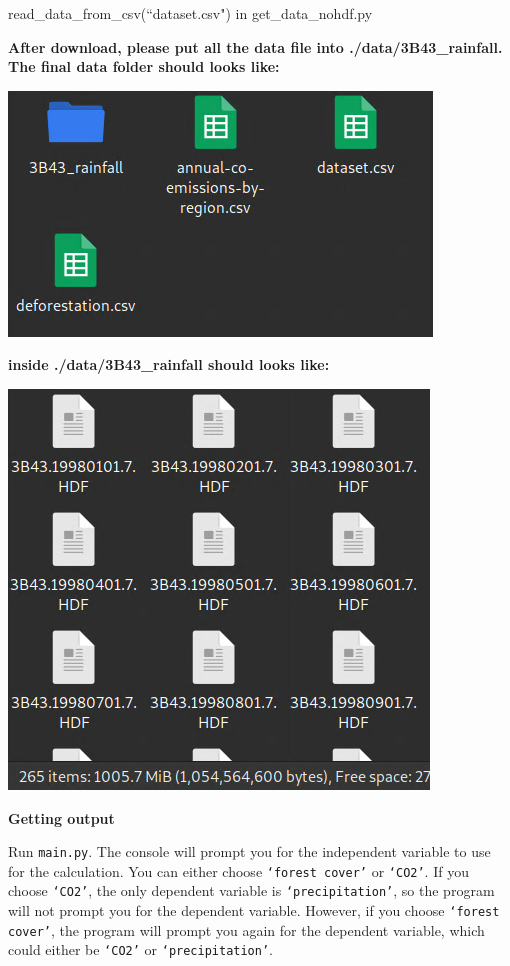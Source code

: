 \documentclass[12pt]{article}
\begin{document}
\begin{enumerate}
\begin{text}
read\_data\_from\_csv(``dataset.csv") in get\_data\_nohdf.py

\textbf{After download, please put all the data file into ./data/3B43\_rainfall. The final data folder should looks like:
}

\includegraphics[scale=0.5]{pics/datafolder.png}

\textbf{inside ./data/3B43\_rainfall should looks like:}

\includegraphics[scale=0.5]{pics/rainfallfolder.png}

\textbf{Getting output}

Run \texttt{main.py}. The console will prompt you for the independent variable to use for the calculation. You can either choose \texttt{`forest cover'} or \texttt{`CO2'}. If you choose \texttt{`CO2'}, the only dependent variable is \texttt{`precipitation'}, so the program will not prompt you for the dependent variable. However, if you choose \texttt{`forest cover'}, the program will prompt you again for the dependent variable, which could either be \texttt{`CO2'} or \texttt{`precipitation'}.


\end{text}
\end{enumerate}
\end{document}
